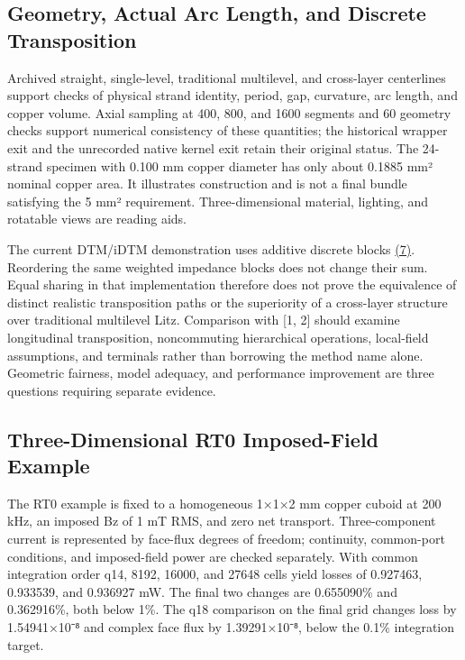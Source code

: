 \documentclass[11pt]{article}
\begin{document}
\subsection*{Geometry, Actual Arc Length, and Discrete Transposition}
\hypertarget{S2.geometry.heading}{}
Archived straight, single-level, traditional multilevel, and cross-layer centerlines support checks of physical strand identity, period, gap, curvature, arc length, and copper volume. Axial sampling at 400, 800, and 1600 segments and 60 geometry checks support numerical consistency of these quantities; the historical wrapper exit and the unrecorded native kernel exit retain their original status. The 24-strand specimen with 0.100 mm copper diameter has only about 0.1885 mm² nominal copper area. It illustrates construction and is not a final bundle satisfying the 5 mm² requirement. Three-dimensional material, lighting, and rotatable views are reading aids.


The current DTM/iDTM demonstration uses additive discrete blocks \href{paper_en_single.pdf#E06}{(7)}. Reordering the same weighted impedance blocks does not change their sum. Equal sharing in that implementation therefore does not prove the equivalence of distinct realistic transposition paths or the superiority of a cross-layer structure over traditional multilevel Litz. Comparison with [1, 2] should examine longitudinal transposition, noncommuting hierarchical operations, local-field assumptions, and terminals rather than borrowing the method name alone. Geometric fairness, model adequacy, and performance improvement are three questions requiring separate evidence.


\subsection*{Three-Dimensional RT0 Imposed-Field Example}
\hypertarget{S2.rt0.heading}{}
The RT0 example is fixed to a homogeneous 1×1×2 mm copper cuboid at 200 kHz, an imposed Bz of 1 mT RMS, and zero net transport. Three-component current is represented by face-flux degrees of freedom; continuity, common-port conditions, and imposed-field power are checked separately. With common integration order q14, 8192, 16000, and 27648 cells yield losses of 0.927463, 0.933539, and 0.936927 mW. The final two changes are 0.655090\% and 0.362916\%, both below 1\%. The q18 comparison on the final grid changes loss by 1.54941×10⁻⁸ and complex face flux by 1.39291×10⁻⁸, below the 0.1\% integration target.
\end{document}
